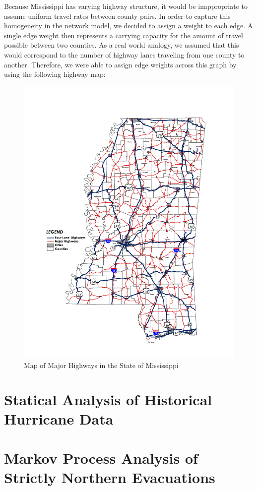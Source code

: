 \documentclass[titlepage]{article}
\begin{document}
  Because Mississippi has varying highway structure, it would be inappropriate to assume uniform travel rates between county pairs. In order to capture this homogeneity in the network model, we decided to assign a weight to each edge. A single edge weight then represents a carrying capacity for the amount of travel possible between two counties. As a real world analogy, we assumed that this would correspond to the number of highway lanes traveling from one county to another. Therefore, we were able to assign edge weights across this graph by using the following highway map:
  \begin{figure}[H]
  \centering
  \includegraphics[width=.75\textwidth]{ms_highways.pdf}
  \caption{Map of Major Highways in the State of Mississippi \cite{ms_highways}}
  \end{figure}



\section{Statical Analysis of Historical Hurricane Data}
\label{sec:hurricanes}


\section{Markov Process Analysis of Strictly Northern Evacuations}
\label{sec:markov}
\end{document}
